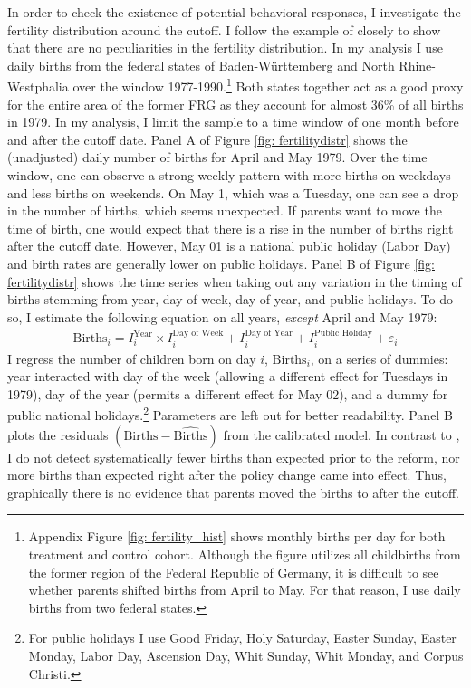 \documentclass[11pt, a4paper]{article} %
\begin{document}
In order to check the existence of potential behavioral responses, I investigate the fertility distribution around the cutoff. I follow the example of \cite{gans2009born} closely to show that there are no peculiarities in the fertility distribution. In my analysis I use daily births from the federal states of Baden-Württemberg and North Rhine-Westphalia over the window 1977-1990.\footnote{Appendix Figure \ref{fig: fertility_hist} shows monthly births per day for both treatment and control cohort. Although the figure utilizes all childbirths from the former region of the Federal Republic of Germany, it is difficult to see whether parents shifted births from April to May. For that reason, I use daily births from two federal states.} Both states together act as a good proxy for the entire area of the former FRG as they account for almost 36\% of all births in 1979. In my analysis, I limit the sample to a time window of one month before and after the cutoff date. Panel A of Figure \ref{fig: fertilitydistr} shows the (unadjusted) daily number of births for April and May 1979. Over the time window, one can observe a strong weekly pattern with more births on weekdays and less births on weekends. On May 1, which was a Tuesday, one can see a drop in the number of births, which seems unexpected. If parents want to move the time of birth, one would expect that there is a rise in the number of births right after the cutoff date. However, May 01 is a national public holiday (Labor Day) and birth rates are generally lower on public holidays. \newline 
Panel B of Figure \ref{fig: fertilitydistr} shows the time series when taking out any variation in the timing of births stemming from year, day of week, day of year, and public holidays. To do so, I estimate the following equation on all years, \emph{except} April and May 1979:
\begin{align}
\text{Births}_i = I^{\text{Year}}_i\times I^{\text{Day of Week}}_i + I^{\text{Day of Year}}_i + I^{\text{Public Holiday}}_i + \varepsilon_i \label{eq: validity_fig}
\end{align}
I regress the number of children born on day $i$, $\text{Births}_i$, on a series of dummies: year interacted with day of the week (allowing a different effect for Tuesdays in 1979), day of the year (permits a different effect for May 02), and a dummy for public national holidays.\footnote{For public holidays I use Good Friday, Holy Saturday, Easter Sunday, Easter Monday, Labor Day, Ascension Day, Whit Sunday, Whit Monday, and Corpus Christi.} Parameters are left out for better readability. Panel B plots the residuals $(\text{Births}-\widehat{\text{Births}})$ from the calibrated model. In contrast to \cite{gans2009born}, I do not detect systematically fewer births than expected prior to the reform, nor more births than expected right after the policy change came into effect. Thus, graphically there is no evidence that parents moved the births to after the cutoff. \newline 
\end{document}
